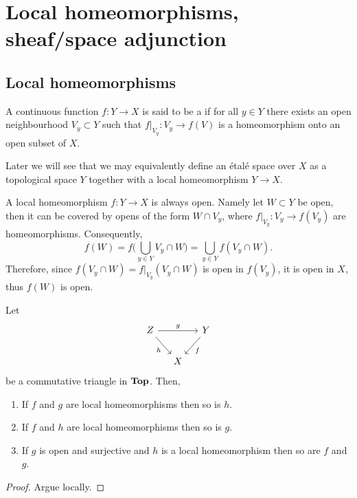 \documentclass[../main.tex]{subfiles}
\begin{document}

\chapter{Local homeomorphisms, sheaf/space adjunction}

\section{Local homeomorphisms}
\noindent

\begin{defn}
    A continuous function $f\colon Y\to X$ is said to be a  if for all $y\in Y$ there exists an open neighbourhood $V_y\subset Y$ such that $f|_{V_y}\colon V_y\to f(V)$ is a homeomorphism onto an open subset of $X$. 
\end{defn}

Later we will see that we may equivalently define an étalé space over $X$ as a topological space $Y$ together with a local homeomorphism $Y\to X$. 
\begin{rmk}
    A local homeomorphism $f\colon Y\to X$ is always open. Namely let $W\subset Y$ be open, then it can be covered by opens of the form $W\cap V_y$, where $f|_{V_y}\colon V_y \to f(V_y)$ are homeomorphisms. Consequently,
\[f(W) = f\bigl(\bigcup_{y\in Y} V_y\cap W \bigr) = \bigcup_{y\in Y} f(V_y\cap W)\text{.}\] Therefore, since $f(V_y\cap W) = f|_{V_y}(V_y\cap W)$ is open in $f(V_y)$, it is open in $X$, thus $f(W)$ is open.
\end{rmk}

\begin{lem}\label{lem:localhomtriangle}
    Let
    \[\begin{tikzcd}[column sep=small]
    Z \arrow[rr, "g"] \arrow[rd, "h"'] &   & Y \arrow[ld, "f"] \\
                                       & X &                  
    \end{tikzcd}\]
    be a commutative triangle in $\mathbf{Top}$. Then,
    \begin{enumerate}
        \item\label{lem:localhomtriangle:f-g} If $f$ and $g$ are local homeomorphisms then so is $h$.
        \item\label{lem:localhomtriangle:f-h} If $f$ and $h$ are local homeomorphisms then so is $g$.
        \item\label{lem:localhomtriangle:g-open-surj-h} If $g$ is open and surjective and $h$ is a local homeomorphism then so are $f$ and $g$.
    \end{enumerate}
\end{lem}
\begin{proof}
    Argue locally. 
\end{proof}
\end{document}
